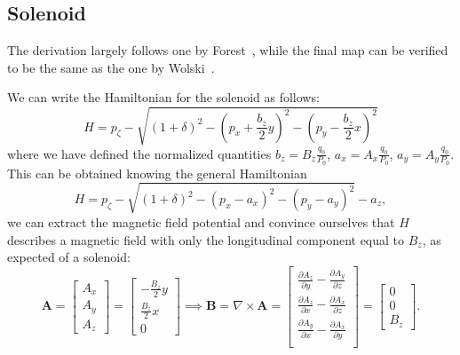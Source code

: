 \subsection{Solenoid}

The derivation largely follows one by Forest~\cite{forest99}, while the final map can be verified to be the same as the one by Wolski~\cite{wolski2014beam}.

We can write the Hamiltonian for the solenoid as follows:
\begin{equation}
  H = p_\zeta -\sqrt{\left(1 + \delta \right)^2 - \left(p_x + \frac{b_z}{2}y\right)^2 - \left(p_y - \frac{b_z}{2}x\right)^2}
\end{equation}
where we have defined the normalized quantities $b_z = B_z\frac{q_0}{P_0}$, $a_x = A_x\frac{q_0}{P_0}$, $a_y = A_y\frac{q_0}{P_0}$.
This can be obtained knowing the general Hamiltonian
\begin{equation}
  H = p_\zeta -\sqrt{(1 + \delta)^2 - (p_x - a_x)^2 - (p_y - a_y)^2} - a_z,
\end{equation}
we can extract the magnetic field potential and convince ourselves that $H$ describes a magnetic field with only the longitudinal component equal to $B_z$, as expected of a solenoid:
\begin{equation}
  \mathbf{A} =
  \begin{bmatrix}
    A_x \\ A_y \\ A_z
  \end{bmatrix}
  = \begin{bmatrix}
    -\frac{B_z}{2}y\\
    \frac{B_z}{2}x\\
    0
  \end{bmatrix}
  \implies
  \mathbf{B} = \nabla \times \mathbf{A}
  = \begin{bmatrix}
    \frac{\partial A_z}{\partial y} - \frac{\partial A_y}{\partial z}\\
    \frac{\partial A_z}{\partial x} - \frac{\partial A_x}{\partial z}\\
    \frac{\partial A_y}{\partial x} - \frac{\partial A_x}{\partial y}\\
  \end{bmatrix}
  = \begin{bmatrix}
    0\\
    0\\
    B_z
  \end{bmatrix}.
\end{equation}

